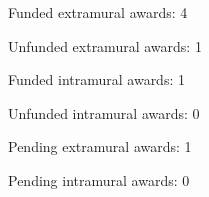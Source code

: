 \begin{veryTightItemize}
    \item Funded extramural awards: 4
    \item Unfunded extramural awards: 1
    \item Funded intramural awards: 1
    \item Unfunded intramural awards: 0
    \item Pending extramural awards: 1
    \item Pending intramural awards: 0
\end{veryTightItemize}
